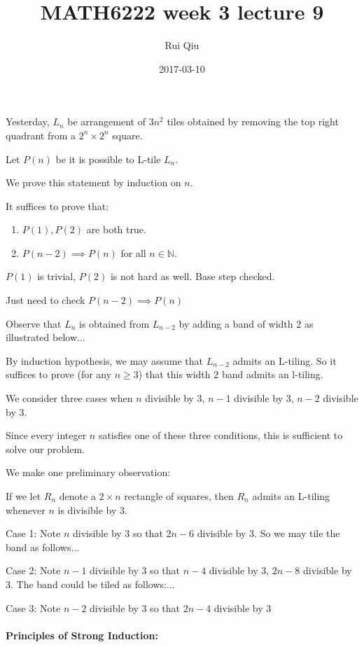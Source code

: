 \documentclass[a4paper, 11pt, twoside]{article}
\begin{document}
\title{MATH6222 week 3 lecture 9}
\author{Rui Qiu}
\date{2017-03-10}

\maketitle

Yesterday, $L_n$ be arrangement of $3n^2$ tiles obtained by removing the top right quadrant from a $2^n\times 2^n$ square.

Let $P(n)$ be it is possible to L-tile $L_n$.

We prove this statement by induction on $n$.

It suffices to prove that:

\begin{enumerate}
	\item $P(1), P(2)$ are both true.
	\item $P(n-2)\implies P(n)$ for all $n\in\mathbb{N}$.
\end{enumerate}

$P(1)$ is trivial, $P(2)$ is not hard as well. Base step checked.

Just need to check $P(n-2)\implies P(n)$

Observe that $L_n$ is obtained from $L_{n-2}$ by adding a band of width $2$ as illustrated below...

By induction hypothesis, we may assume that $L_{n-2}$ admits an L-tiling. So it suffices to prove (for any $n\geq 3$) that this width $2$ band admits an l-tiling.

We consider three cases when $n$ divisible by $3$, $n-1$ divisible by $3$, $n-2$ divisible by $3$.

Since every integer $n$ satisfies one of these three conditions, this is sufficient  to solve our problem.

We make one preliminary observation:

If we let $R_n$ denote a $2\times n$ rectangle of squares, then $R_n$ admits an L-tiling whenever $n$ is divisible by $3$.

Case 1: Note $n$ divisible by $3$ so that $2n-6$ divisible by $3$. So we may tile the band as follows...

Case 2: Note $n-1$ divisible by $3$ so that $n-4$ divisible by $3$, $2n-8$ divisible by $3$. The band could be tiled as follows:...

Case 3: Note $n-2$ divisible by $3$ so that $2n-4$ divisible by $3$\\

\paragraph{Principles of Strong Induction:}
\end{document}
